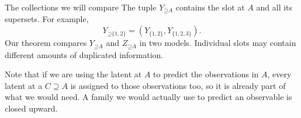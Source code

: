 \documentclass[aspectratio=169,12pt]{beamer}
\newcommand{\Up}{\mathord{\supseteq}}
\begin{document}
\begin{frame}{The collections we will compare}
The tuple $Y_{\Up A}$ contains the slot at $A$ and all its supersets.
For example,
\[
Y_{\Up\{1,2\}}=(Y_{\{1,2\}},Y_{\{1,2,3\}}).
\]
Our theorem compares $Y_{\Up A}$ and $Z_{\Up A}$ in two models.
Individual slots may contain different amounts of duplicated information.
\medskip

Note that if we are using the latent at $A$ to predict the observations in
$A$, every latent at a $C\supseteq A$ is assigned to those observations too,
so it is already part of what we would need. A family we would actually use to predict an observable is
closed upward.
\end{frame}
\end{document}
